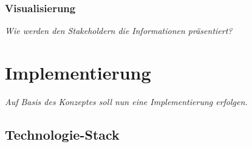 		\subsubsection{Visualisierung}
		\textit{Wie werden den Stakeholdern die Informationen präsentiert?}

\section{Implementierung}

	\textit{Auf Basis des Konzeptes soll nun eine Implementierung erfolgen.}

	\subsection{Technologie-Stack}